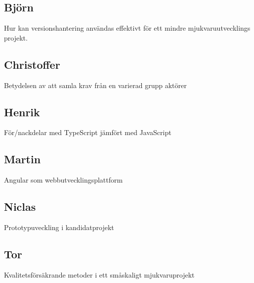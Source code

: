\subsection{Björn}
Hur kan versionshantering användas effektivt för ett mindre mjukvaruutvecklings projekt.
\subsection{Christoffer}
Betydelsen av att samla krav från en varierad grupp aktörer
\subsection{Henrik}
För/nackdelar med TypeScript jämfört med JavaScript
\subsection{Martin}
Angular som webbutvecklingsplattform
\subsection{Niclas}
Prototypuveckling i kandidatprojekt 
\subsection{Tor}
Kvalitetsförsäkrande metoder i ett småskaligt mjukvaruprojekt

